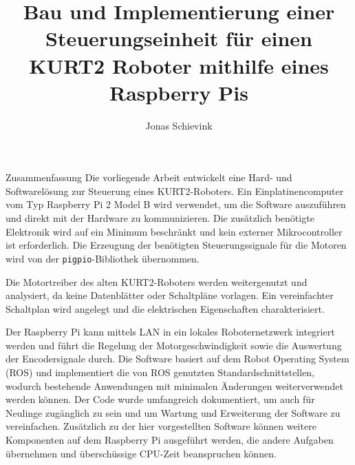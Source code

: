 \documentclass[german]{thesis_KBS}
\newcommand{\code}[1]{\texttt{#1}}  %
\begin{document}
\title{Bau und Implementierung einer Steuerungseinheit für einen KURT2 Roboter mithilfe eines Raspberry Pis}
\author{Jonas Schievink}


\generatetitle

\cleardoublepage

\begin{prefacesection}{Zusammenfassung}
Die vorliegende Arbeit entwickelt eine Hard- und Softwarelösung zur Steuerung
eines KURT2-Roboters. Ein Einplatinencomputer vom Typ Raspberry Pi 2 Model B
wird verwendet, um die Software auszuführen und direkt mit der Hardware zu
kommunizieren. Die zusätzlich benötigte Elektronik wird auf ein Minimum
beschränkt und kein externer Mikrocontroller ist erforderlich. Die Erzeugung der
benötigten Steuerungssignale für die Motoren wird von der
\code{pigpio}-Bibliothek übernommen.

Die Motortreiber des alten KURT2-Roboters werden weitergenutzt und analysiert,
da keine Datenblätter oder Schaltpläne vorlagen. Ein vereinfachter Schaltplan
wird angelegt und die elektrischen Eigenschaften charakterisiert.

Der Raspberry Pi kann mittels LAN in ein lokales Roboternetzwerk integriert
werden und führt die Regelung der Motorgeschwindigkeit sowie die Auswertung der
Encodersignale durch. Die Software basiert auf dem Robot Operating System (ROS)
und implementiert die von ROS genutzten Standardschnittstellen, wodurch
bestehende Anwendungen mit minimalen Änderungen weiterverwendet werden können.
Der Code wurde umfangreich dokumentiert, um auch für Neulinge zugänglich zu sein
und um Wartung und Erweiterung der Software zu vereinfachen. Zusätzlich zu der
hier vorgestellten Software können weitere Komponenten auf dem Raspberry Pi
ausgeführt werden, die andere Aufgaben übernehmen und überschüssige CPU-Zeit
beanspruchen können.
\end{prefacesection}

\cleardoublepage
\tableofcontents


\startTextChapters

\end{document}
